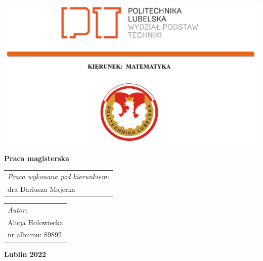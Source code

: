 \documentclass[12pt]{mwbk}
\theoremstyle{plain}
\theoremstyle{definition}
\theoremstyle{remark}
\begin{document}
\noindent\hspace{-32pt}\includegraphics{rys/logopl}
\begin{center}
	







\vfill %
     


\vfill

\textbf{Praca magisterska}

\vfill
\vfill
\vfill

\large
\tytul

\vfill

\emph{\tytulangielski}


\vfill
\vfill
\vfill
\vfill
\vfill

\begin{tabular}[t]{l}
\emph{Praca wykonana pod kierunkiem:}
\\
dra Dariusza Majerka
\end{tabular}
\hfill
\begin{tabular}[t]{l}
	\emph{Autor:}
\\
Alicja Hołowiecka\\
nr albumu: 89892 
\end{tabular}

\vfill
\vfill
\vfill

\textbf{Lublin 2022}

\end{center}
\end{document}
